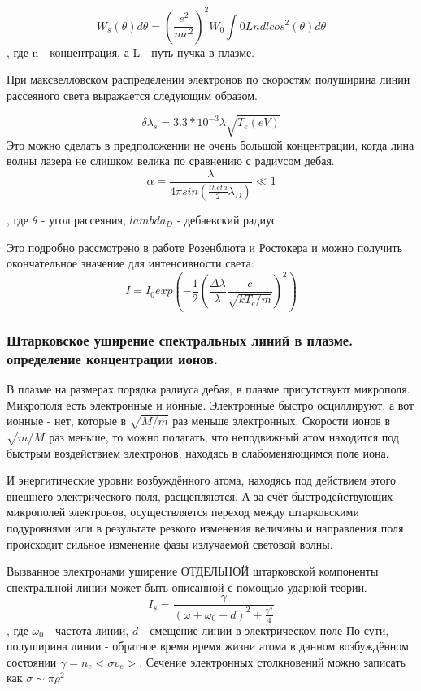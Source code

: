 \documentclass[10pt, a4paper]{article}
\numberwithin{equation}{section}
\begin{document}
\begin{equation}
	W_{s} (\theta) d\theta=(\frac{e^{2}}{mc^{2}})^{2} W_0 \int {0}{L} n dl cos^{2}(\theta) d \theta
\end{equation}
, где n -  концентрация, а L - путь пучка в плазме.

При максвелловском распределении электронов по скоростям полуширина линии рассеяного света выражается следующим образом.

\begin{equation}
	\delta \lambda_s = 3.3*10^{-3} \lambda \sqrt{T_e (eV)}
\end{equation}
Это можно сделать в предположении не очень большой концентрации, когда лина волны лазера не слишком велика по сравнению с радиусом дебая.
\begin{equation}
	\alpha = \frac{\lambda}{4\pi sin(\frac{theta}{2} \lambda_D)} \ll 1
\end{equation}

, где $\theta$ - угол рассеяния, $lambda_D$ - дебаевский радиус

Это подробно рассмотрено в работе Розенблюта и Ростокера и можно получить окончательное значение для интенсивности света:
\begin{equation}
	I=I_0 exp(- \frac{1}{2} (\frac{\Delta \lambda}{\lambda} \frac{c}{\sqrt{kT_e /m}})^{2})
\end{equation}


\subsubsection{ Штарковское уширение спектральных линий в плазме. определение концентрации ионов.}
\label{11.2.3.3}

В плазме на размерах порядка радиуса дебая, в плазме присутствуют микрополя. Микрополя есть электронные и ионные. Электронные быстро осциллируют, а вот ионные - нет, которые в $\sqrt{M/m}$ раз меньше электронных. Скорости ионов в $\sqrt{m/M}$ раз меньше, то можно полагать, что неподвижный атом находится под быстрым воздействием электронов, находясь в слабоменяющимся поле иона. 

И энергитические уровни возбуждённого атома, находясь под действием этого внешнего электрического поля, расщепляются. А за счёт быстродействующих микрополей электронов, осуществляется переход между штарковскими подуровнями или в результате резкого изменения величины и направления поля происходит сильное изменение фазы излучаемой световой волны. 

Вызванное электронами уширение ОТДЕЛЬНОЙ штарковской компоненты спектральной линии может быть описанной с помощью ударной теории.
\begin{equation}
	I_s=\frac{\gamma}{(\omega + \omega_0 - d)^{2}+ \frac{\gamma^{2}}{4}}
\end{equation}
, где $\omega_0$ - частота линии, $d$ -  смещение линии в электрическом поле
По сути, полуширина линии - обратное время время жизни атома в данном возбуждённом состоянии $\gamma =n_e <\sigma v_e>$.
Сечение электронных столкновений можно записать как $\sigma \sim \pi \rho^{2}$
\end{document}
